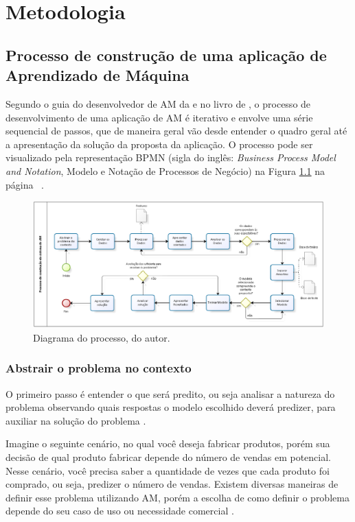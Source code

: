 \chapter{Metodologia}
\section{Processo de construção de uma aplicação de Aprendizado de Máquina}

Segundo o guia do desenvolvedor de AM da  e no livro de , o processo de desenvolvimento de uma aplicação de AM é iterativo e envolve uma série sequencial de passos, que de maneira geral vão desde entender o quadro geral até a apresentação da solução da proposta da aplicação. O processo pode ser visualizado pela representação BPMN (sigla do inglês: \textit{Business Process Model and Notation}, Modelo e Notação de Processos de Negócio) na Figura \ref{ProcessoAM} na página ~\pageref{ProcessoAM}.

\begin{figure}[h]
	\centering
	\includegraphics[width=1\textwidth]{figuras/Processoam.eps}
	\caption{Diagrama do processo, do autor.}
	\label{ProcessoAM}
\end{figure}

\subsection{Abstrair o problema no contexto}
O primeiro passo é entender o que será predito, ou seja analisar a natureza do problema observando quais respostas o modelo escolhido deverá predizer, para auxiliar na solução do problema \cite{geron2017hands}.

Imagine o seguinte cenário, no qual você deseja fabricar produtos, porém sua decisão de qual produto fabricar depende do número de vendas em potencial. Nesse cenário, você precisa saber a quantidade de vezes que cada produto foi comprado, ou seja, predizer o número de vendas. Existem diversas maneiras de definir esse problema utilizando AM, porém a escolha de como definir o problema depende do seu caso de uso ou necessidade comercial \cite{Amazon}.

